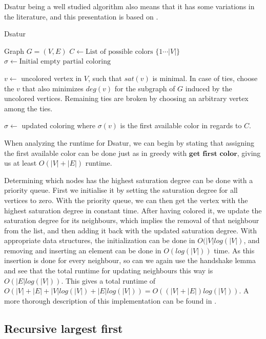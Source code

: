 \documentclass[a4paper]{article}
\begin{document}
Dsatur being a well studied
algorithm also means that it has some variations in the literature, and this
presentation is based on \cite{Constructive}.
\begin{algorithm}[H]
  \caption{Dsatur}
    \label{alg:dsatur}
  \begin{algorithmic}[1]
      \REQUIRE Graph $G = (V,E)$
      \STATE $C \leftarrow \text{List of possible colors $\{1 \cdots |V| \}$ }$
      \STATE $\sigma \leftarrow \text{Initial empty partial coloring}$
      

        \STATE $v \leftarrow$ uncolored vertex in $V$, such that $sat(v)$ is
        minimal. In case of ties, choose the $v$ that also minimizes $deg(v)$
        for the subgraph of $G$ induced by the uncolored vertices. Remaining
        ties are broken by choosing an arbitrary vertex among the ties.

        \STATE $\sigma \leftarrow$ updated coloring where $\sigma(v)$ is the first
        available color in regards to $C$.
      \ENDWHILE
  \end{algorithmic}
\end{algorithm}
When analyzing the runtime for Dsatur, we can begin by stating that
assigning the first available color can be done just as in greedy with
$\textbf{get first color}$, giving us at least $O(|V|+|E|)$ runtime. 

Determining which nodes has the highest saturation degree can be done with a
priority queue.  First we initialise it by setting the saturation degree for all
vertices to zero. With the priority queue, we can then get the vertex with the
highest saturation degree in constant time. After having colored it, we update
the saturation degree for its neighbours, which implies the removal of that
neighbour from the list, and then adding it back with the updated saturation
degree. With appropriate data structures, the initialization can be done in
$O(|V|log(|V|)$, and removing and inserting an element can be done in $O(log(|V|))$
time. As this insertion is done for every neighbour, so can we again use the handshake
lemma and see that the total runtime for updating neighbours this way is
$O(|E|log(|V|))$. This gives a total runtime of $O(|V|+|E|+|V|log(|V|)+|E|log(|V|))
= O( (|V|+|E|)log(|V|))$. A more thorough description of this implementation can
be found in \cite{Constructive}.

\subsection{Recursive largest first}
\end{document}
